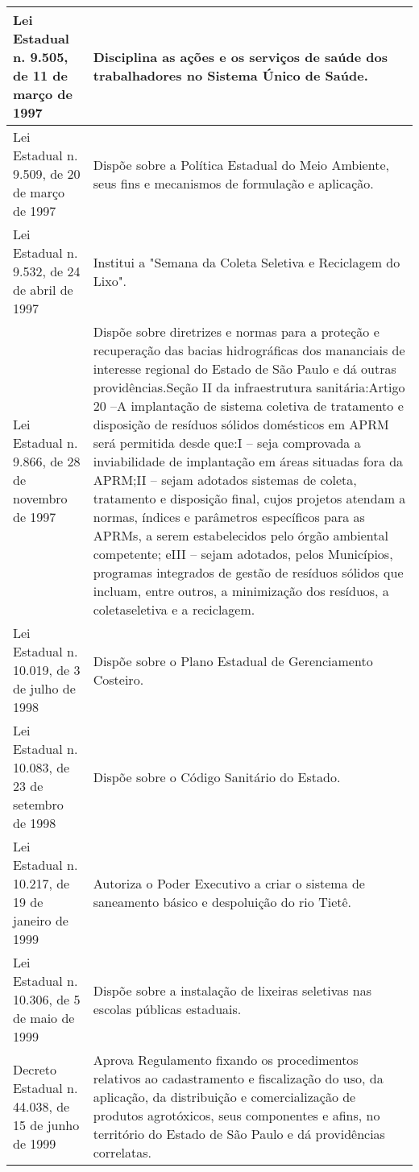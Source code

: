 \begin{center}
\begin{longtable}{|p{}|p{}|}
			\hline
			Lei Estadual n. 9.505, de 11 de março de 1997 & Disciplina as ações e os serviços de saúde dos trabalhadores no Sistema Único de Saúde. \\
			\hline
			Lei Estadual n. 9.509, de 20 de março de 1997 & Dispõe sobre a Política Estadual do Meio Ambiente, seus fins e mecanismos de formulação e aplicação. \\
			\hline
			Lei Estadual n. 9.532, de 24 de abril de 1997 & Institui a "Semana da Coleta Seletiva e Reciclagem do Lixo". \\
			\hline
			Lei Estadual n. 9.866, de 28 de novembro de 1997 & Dispõe  sobre  diretrizes  e  normas  para  a  proteção  e  recuperação  das  bacias hidrográficas dos mananciais de interesse regional do Estado de São Paulo e dá outras providências.\newline{}Seção II da infraestrutura sanitária:\newline{}Artigo  20  –A  implantação  de  sistema  coletiva  de  tratamento  e  disposição  de resíduos sólidos domésticos em APRM será permitida desde que:\newline{}I – seja comprovada a inviabilidade de implantação em áreas situadas fora da APRM;\newline{}II  –  sejam  adotados  sistemas  de  coleta,  tratamento  e  disposição  final,  cujos projetos atendam a normas, índices e parâmetros específicos para as APRMs, a serem estabelecidos pelo órgão ambiental competente; e\newline{}III  –  sejam  adotados,  pelos  Municípios,  programas  integrados  de  gestão  de resíduos sólidos que incluam, entre outros, a minimização dos resíduos, a coleta\newline{}seletiva e a reciclagem. \\
			\hline
			Lei Estadual n. 10.019, de 3 de julho de 1998 & Dispõe sobre o Plano Estadual de Gerenciamento Costeiro. \\
			\hline
			Lei  Estadual  n.  10.083,  de  23 de setembro de 1998 & Dispõe sobre o Código Sanitário do Estado. \\
			\hline
			Lei  Estadual  n.  10.217,  de  19 de janeiro de 1999 & Autoriza   o   Poder   Executivo   a   criar   o   sistema   de   saneamento   básico   e despoluição do rio Tietê. \\
			\hline
			Lei Estadual n. 10.306, de 5 de maio de 1999 & Dispõe sobre a instalação de lixeiras seletivas nas escolas públicas estaduais. \\
			\hline
			Decreto Estadual n. 44.038, de 15 de junho de 1999 & Aprova  Regulamento  fixando  os  procedimentos  relativos  ao  cadastramento  e fiscalização do uso, da aplicação, da distribuição e comercialização de produtos agrotóxicos, seus componentes e afins, no território do Estado de São Paulo e dá providências correlatas. \\

\end{longtable}
\end{center}
